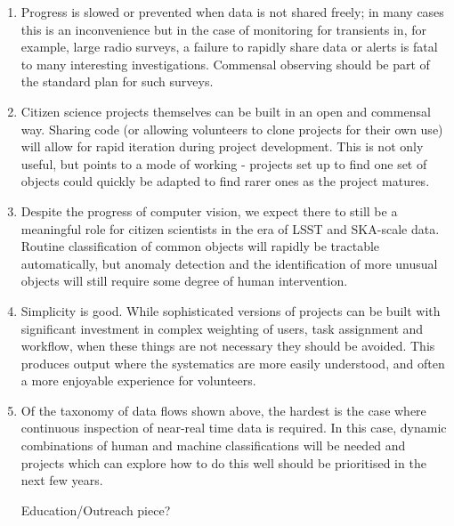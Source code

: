 \documentclass{pasa}
\begin{document}
\begin{enumerate} 

\item Progress is slowed or prevented when data is not shared freely; in many cases this is an inconvenience but in the case of monitoring for transients in, for example, large radio surveys, a failure to rapidly share data or alerts is fatal to many interesting investigations. Commensal observing should be part of the standard plan for such surveys.

\item Citizen science projects themselves can be built in an open and commensal way. Sharing code (or allowing volunteers to clone projects for their own use) will allow for rapid iteration during project development. This is not only useful, but points to a mode of working - projects set up to find one set of objects could quickly be adapted to find rarer ones as the project matures. 

\item Despite the progress of computer vision, we expect there to still be a meaningful role for citizen scientists in the era of LSST and SKA-scale data. Routine classification of common objects will rapidly be tractable automatically, but anomaly detection and the identification of more unusual objects will still require some degree of human intervention. 

\item Simplicity is good. While sophisticated versions of projects can be built with significant investment in complex weighting of users, task assignment and workflow, when these things are not necessary they should be avoided. This produces output where the systematics are more easily understood, and often a more enjoyable experience for volunteers. 

\item Of the taxonomy of data flows shown above, the hardest is the case where continuous inspection of near-real time data is required. In this case, dynamic combinations of human and machine classifications will be needed and projects which can explore how to do this well should be prioritised in the next few years.

\item [Education/Outreach piece?]

\end{enumerate} 
\end{document}
